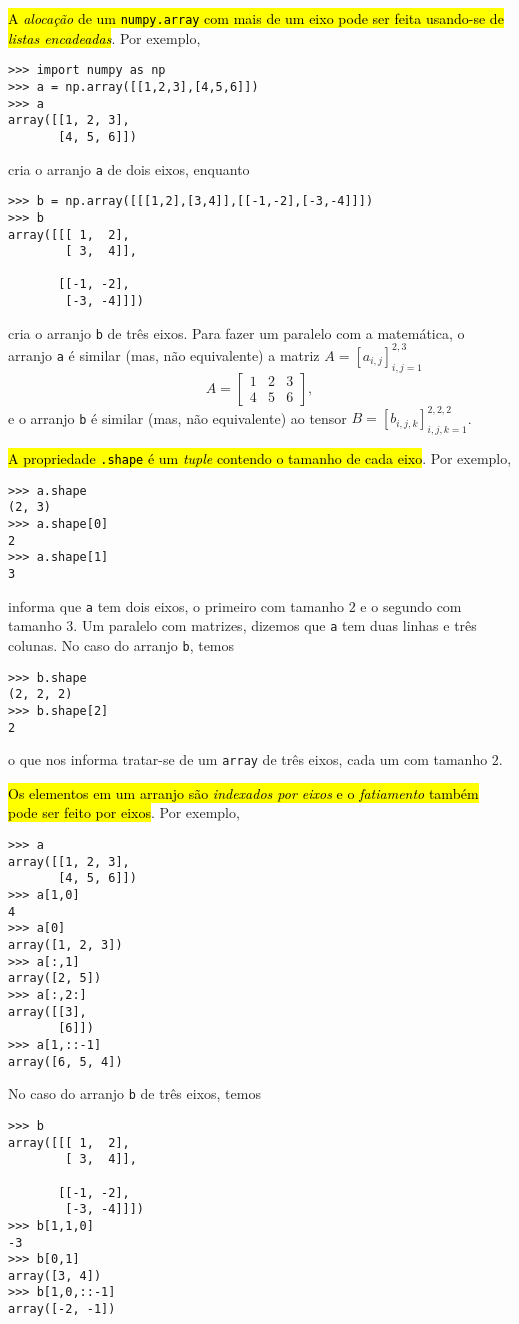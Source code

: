 \hl{A \emph{alocação} de um {\lstinline+numpy.array+} com mais de um eixo pode ser feita usando-se de \emph{listas encadeadas}}. Por exemplo,
\begin{lstlisting}
>>> import numpy as np
>>> a = np.array([[1,2,3],[4,5,6]])
>>> a
array([[1, 2, 3],
       [4, 5, 6]])
\end{lstlisting}
cria o arranjo \lstinline+a+ de dois eixos, enquanto
\begin{lstlisting}
>>> b = np.array([[[1,2],[3,4]],[[-1,-2],[-3,-4]]])
>>> b
array([[[ 1,  2],
        [ 3,  4]],

       [[-1, -2],
        [-3, -4]]])
\end{lstlisting}
cria o arranjo \lstinline+b+ de três eixos. Para fazer um paralelo com a matemática, o arranjo \lstinline+a+ é similar (mas, não equivalente) a matriz $A = [a_{i,j}]_{i,j=1}^{2,3}$
\begin{equation}
  A =
  \begin{bmatrix}
    1 & 2 & 3\\
    4 & 5 & 6
  \end{bmatrix},
\end{equation}
e o arranjo \lstinline+b+ é similar (mas, não equivalente) ao tensor $B = [b_{i,j,k}]_{i,j,k=1}^{2,2,2}$.

\hl{A propriedade {\lstinline+.shape+} é um \textit{tuple} contendo o tamanho de cada eixo}. Por exemplo,
\begin{lstlisting}
>>> a.shape
(2, 3)
>>> a.shape[0]
2
>>> a.shape[1]
3
\end{lstlisting}
informa que \lstinline+a+ tem dois eixos, o primeiro com tamanho $2$ e o segundo com tamanho $3$. Um paralelo com matrizes, dizemos que \lstinline+a+ tem duas linhas e três colunas. No caso do arranjo \lstinline+b+, temos
\begin{lstlisting}
>>> b.shape
(2, 2, 2)
>>> b.shape[2]
2
\end{lstlisting}
o que nos informa tratar-se de um \lstinline+array+ de três eixos, cada um com tamanho $2$.

\hl{Os elementos em um arranjo são \emph{indexados por eixos} e o \emph{fatiamento} também pode ser feito por eixos}. Por exemplo,
\begin{lstlisting}
>>> a
array([[1, 2, 3],
       [4, 5, 6]])
>>> a[1,0]
4
>>> a[0]
array([1, 2, 3])
>>> a[:,1]
array([2, 5])
>>> a[:,2:]
array([[3],
       [6]])
>>> a[1,::-1]
array([6, 5, 4])
\end{lstlisting}
No caso do arranjo \lstinline+b+ de três eixos, temos
\begin{lstlisting}
>>> b
array([[[ 1,  2],
        [ 3,  4]],

       [[-1, -2],
        [-3, -4]]])
>>> b[1,1,0]
-3
>>> b[0,1]
array([3, 4])
>>> b[1,0,::-1]
array([-2, -1])
\end{lstlisting}

